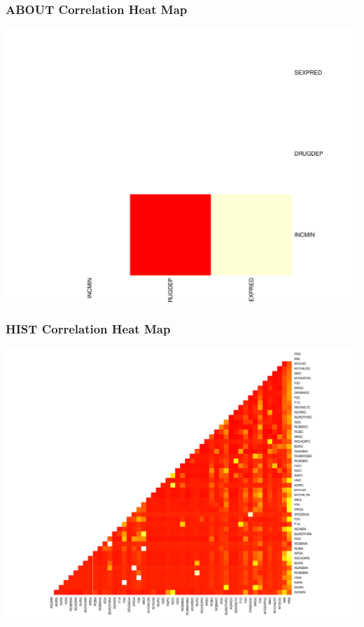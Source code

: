 \documentclass[11pt,letter]{article}
\begin{document}
\subsubsection{ABOUT Correlation Heat Map}
\includegraphics[scale=0.5]{report_figures/about.pdf}
\subsubsection{HIST Correlation Heat Map}
\includegraphics[scale=0.5]{report_figures/hist.pdf}
\end{document}
